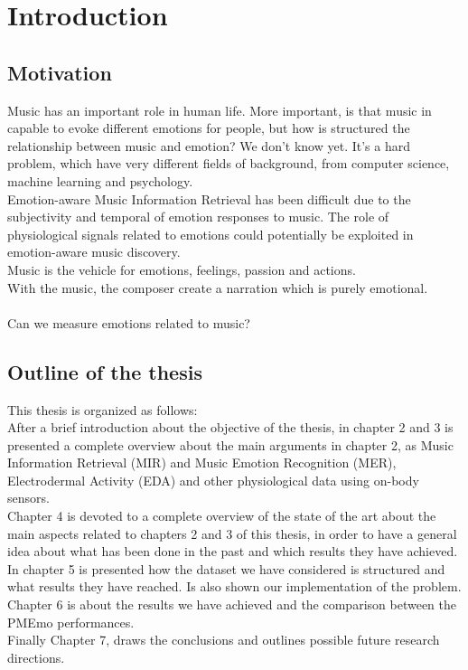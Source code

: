 \chapter{Introduction}
\label{Introduction}
\pagestyle{plain}

\vspace{0.5cm}

\section{Motivation}
Music has an important role in human life. More important, is that music in capable to evoke different emotions for people, but how is structured the relationship between music and emotion? We don't know yet. It's a hard problem, which have very different fields of background, from computer science, machine learning and psychology.
\\ \indent
Emotion-aware Music Information Retrieval has been difficult due to the subjectivity and temporal of emotion responses to music. The role of physiological signals related to emotions could potentially be exploited in emotion-aware music discovery.
\\ \indent
Music is the vehicle for emotions, feelings, passion and actions.
\\
With the music, the composer create a narration which is purely emotional.
\\ \\
Can we measure emotions related to music?

\section{Outline of the thesis}
This thesis is organized as follows:
\\ \indent
After a brief introduction about the objective of the thesis, in chapter 2 and 3 is presented a complete overview about the main arguments in chapter 2, as Music Information Retrieval (MIR) and Music Emotion Recognition (MER), Electrodermal Activity (EDA) and other physiological data using on-body sensors.
\\ \indent
Chapter 4 is devoted to a complete overview of the state of the art about the main aspects related to chapters 2 and 3 of this thesis, in order to have a general idea about what has been done in the past and which results they have achieved.
\\ \indent
In chapter 5 is presented how the dataset we have considered is structured and what results they have reached. Is also shown our implementation of the problem.
\\ \indent
Chapter 6 is about the results we have achieved and the comparison between the PMEmo performances.
\\ \indent
Finally Chapter 7, draws the conclusions and outlines possible future research directions.

